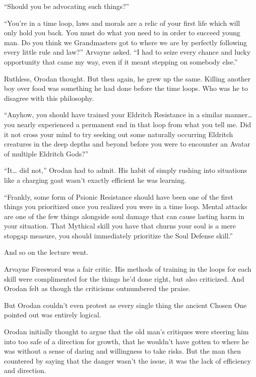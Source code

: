 \documentclass[a4paper,10pt]{book}
\begin{document}
“Should you be advocating such things?”\par
“You’re in a time loop, laws and morals are a relic of your first life which will only hold you back. You must do what you need to in order to succeed young man. Do you think we Grandmasters got to where we are by perfectly following every little rule and law?” Arvayne asked. “I had to seize every chance and lucky opportunity that came my way, even if it meant stepping on somebody else.”\par
Ruthless, Orodan thought. But then again, he grew up the same. Killing another boy over food was something he had done before the time loops. Who was he to disagree with this philosophy.\par
“Anyhow, you should have trained your Eldritch Resistance in a similar manner… you nearly experienced a permanent end in that loop from what you tell me. Did it not cross your mind to try seeking out some naturally occurring Eldritch creatures in the deep depths and beyond before you were to encounter an Avatar of multiple Eldritch Gods?”\par
“It… did not,” Orodan had to admit. His habit of simply rushing into situations like a charging goat wasn’t exactly efficient he was learning.\par
“Frankly, some form of Psionic Resistance should have been one of the first things you prioritized once you realized you were in a time loop. Mental attacks are one of the few things alongside soul damage that can cause lasting harm in your situation. That Mythical skill you have that churns your soul is a mere stopgap measure, you should immediately prioritize the Soul Defense skill.”\par
And so on the lecture went.\par
Arvayne Firesword was a fair critic. His methods of training in the loops for each skill were complimented for the things he’d done right, but also criticized. And Orodan felt as though the criticisms outnumbered the praise.\par
But Orodan couldn’t even protest as every single thing the ancient Chosen One pointed out was entirely logical.\par
Orodan initially thought to argue that the old man’s critiques were steering him into too safe of a direction for growth, that he wouldn’t have gotten to where he was without a sense of daring and willingness to take risks. But the man then countered by saying that the danger wasn’t the issue, it was the lack of efficiency and direction.\par
\end{document}
